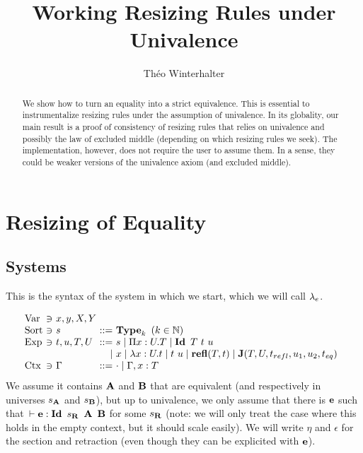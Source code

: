 \documentclass[a4paper,english]{lipics-utf8x}
\title{Working Resizing Rules under Univalence}
\author[1]{Théo Winterhalter}
\begin{document}
  \maketitle

  \begin{abstract}
    We show how to turn an equality into a strict equivalence. This is essential
    to instrumentalize resizing rules under the assumption of univalence.
    In its globality, our main result is a proof of consistency of resizing
    rules that relies on univalence and possibly the law of excluded middle
    (depending on which resizing rules we seek). The implementation, however,
    does not require the user to assume them. In a sense, they could be weaker
    versions of the univalence axiom (and excluded middle).
  \end{abstract}

  \section{Resizing of Equality}

  \subsection{Systems}

  This is the syntax of the system in which we start, which we will call
  $\lambda_e$.

  \[
    \begin{array}{l@{~}l@{~}l@{~}r@{~}l@{\quad}l}
      \Var  & \ni & x,y,X,Y \\
      \Sort & \ni & s             & ::= & \Type_k \mbox{ }
                                                (k \in \mathbb{N}) \\
      \Exp  & \ni & t,u,T,U & ::= & s \mid \Pi x:U.T \mid
                                    \Id T\ t\ u \\
                         &&& \mid & x \mid \lambda x:U.t \mid t~u
                               \mid \refl(T,t) \mid
                               \J (T,U,t_{refl},u_1,u_2,t_{eq}) \\
      \Ctx  & \ni & \Gamma  & ::= & \cdot \mid \Gamma, x:T \\
    \end{array}
  \]
  We assume it contains $\operatorname{\mathbf{A}}$ and $\operatorname{\mathbf{B}}$ that are equivalent (and respectively in
  universes $s_{\operatorname{\mathbf{A}}}$ and $s_{\operatorname{\mathbf{B}}}$), but up to univalence, we only assume that
  there is $\operatorname{\mathbf{e}}$ such that $\,\vdash \operatorname{\mathbf{e}} : \operatorname{\mathbf{Id}~} s_{\operatorname{\mathbf{R}}}\ \operatorname{\mathbf{A}}\ \operatorname{\mathbf{B}}$ for some $s_{\operatorname{\mathbf{R}}}$
  (note: we will only treat the case where this holds in the empty context,
  but it should scale easily).
  We will write $\eta$ and $\epsilon$ for the section and retraction (even
  though they can be explicited with $\operatorname{\mathbf{e}}$).
\end{document}
